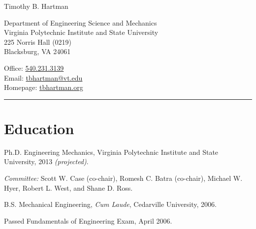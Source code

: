 \documentclass[10pt,letterpaper]{article}
\newcommand\name{Timothy B. Hartman}
\renewenvironment{itemize}{
  \begin{list}{}{
    \setlength{\leftmargin}{1.5em}
    \setlength{\itemsep}{0.25em}
    \setlength{\parskip}{0pt}
    \setlength{\parsep}{0.25em}
  }
}{
  \end{list}
}
\begin{document}
{\huge \name}


\bigskip

\begin{minipage}[t]{0.5\textwidth}
  Department of Engineering Science and Mechanics \\
  Virginia Polytechnic Institute and State University \\
  225 Norris Hall (0219) \\
  Blacksburg, VA 24061
\end{minipage}
\begin{minipage}[t]{0.5\textwidth}
  Office: \href{tel:5402313139}{540.231.3139} \\
\newcommand{\email}{tbhartman@vt.edu}
  Email: \href{mailto:\email}{\email} \\
  Homepage: \href{http://tbhartman.org}{tbhartman.org}
\end{minipage}

\vspace{12pt}

\rule{\textwidth}{1pt}

%
%

\section*{Education}

\begin{itemize}
    \item Ph.D. Engineering Mechanics, Virginia Polytechnic Institute and State University, 2013 \textit{(projected)}.
    \begin{itemize}
        \item \textit{Committee:}
        Scott W. Case (co-chair), Romesh C. Batra (co-chair), Michael W. Hyer, Robert L. West, and Shane D. Ross.
    \end{itemize}
    \item B.S. Mechanical Engineering, \textit{Cum Laude}, Cedarville University, 2006.
    \begin{itemize}
        \item Passed Fundamentals of Engineering Exam, April 2006.
    \end{itemize}
\end{itemize}
\end{document}

